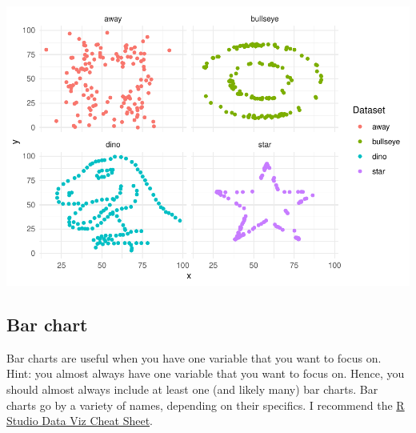 \documentclass[
]{book}
\newenvironment{Shaded}{\begin{snugshade}}{\end{snugshade}}
\newcommand{\DataTypeTok}[1]{\textcolor[rgb]{0.13,0.29,0.53}{#1}}
\newcommand{\DecValTok}[1]{\textcolor[rgb]{0.00,0.00,0.81}{#1}}
\newcommand{\KeywordTok}[1]{\textcolor[rgb]{0.13,0.29,0.53}{\textbf{#1}}}
\newcommand{\NormalTok}[1]{#1}
\newcommand{\OperatorTok}[1]{\textcolor[rgb]{0.81,0.36,0.00}{\textbf{#1}}}
\newcommand{\StringTok}[1]{\textcolor[rgb]{0.31,0.60,0.02}{#1}}
\begin{document}
\begin{Shaded}
\end{Shaded}

\includegraphics{telling_stories_with_data_files/figure-latex/unnamed-chunk-87-1.pdf}

\hypertarget{bar-chart}{%
\subsection{Bar chart}\label{bar-chart}}

Bar charts are useful when you have one variable that you want to focus on. Hint: you almost always have one variable that you want to focus on. Hence, you should almost always include at least one (and likely many) bar charts. Bar charts go by a variety of names, depending on their specifics. I recommend the \href{https://github.com/rstudio/cheatsheets/raw/master/data-visualization-2.1.pdf}{R Studio Data Viz Cheat Sheet}.
\end{document}
